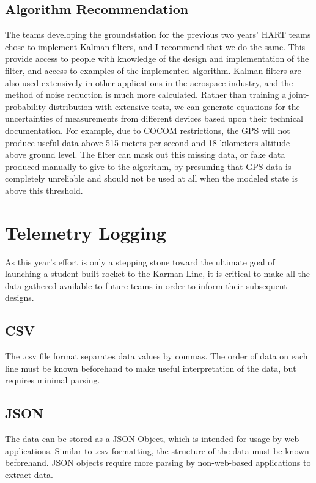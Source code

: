 \documentclass[onecolumn, draftclsnofoot,10pt, compsoc]{IEEEtran}
\begin{document}
		\subsection{Algorithm Recommendation}
			\noindent
			The teams developing the groundstation for the previous two years' HART teams chose to implement Kalman filters, and I recommend that we do the same.
			This provide access to people with knowledge of the design and implementation of the filter, and access to examples of the implemented algorithm.
			Kalman filters are also used extensively in other applications in the aerospace industry\cite{Kalman-Filter}, and the method of noise reduction is much more calculated.
			Rather than training a joint-probability distribution with extensive tests, we can generate equations for the uncertainties of measurements from different devices based upon their technical documentation.
			For example, due to COCOM\cite{COCOM} restrictions, the GPS will not produce useful data above 515 meters per second and 18 kilometers altitude above ground level.
			The filter can mask out this missing data, or fake data produced manually to give to the algorithm, by presuming that GPS data is completely unreliable and should not be used at all when the modeled state is above this threshold.
			
	\section{Telemetry Logging}
		\noindent
		As this year's effort is only a stepping stone toward the ultimate goal of launching a student-built rocket to the Karman Line, it is critical to make all the data gathered available to future teams in order to inform their subsequent designs.
		
		\subsection{CSV}
			\noindent
			The .csv file format separates data values by commas.
			The order of data on each line must be known beforehand to make useful interpretation of the data, but requires minimal parsing.

		\subsection{JSON}
			\noindent
			The data can be stored as a JSON Object, which is intended for usage by web applications.
			Similar to .csv formatting, the structure of the data must be known beforehand.
			JSON objects require more parsing by non-web-based applications to extract data.
			
\end{document}
